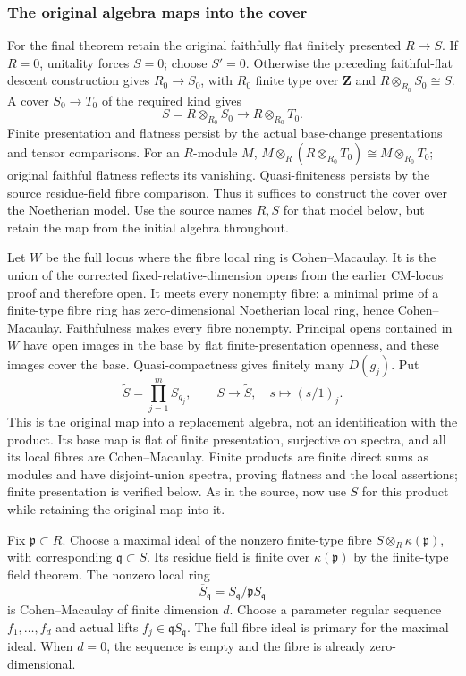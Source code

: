 \subsubsection{The original algebra maps into the cover}\label{algebra-proof-073-the-original-algebra-maps-into-the-cover}

For the final theorem retain the original faithfully flat finitely presented \(R\to S\). If \(R=0\), unitality forces \(S=0\); choose \(S'=0\). Otherwise the preceding faithful-flat descent construction gives \(R_0\to S_0\), with \(R_0\) finite type over \(\mathbf Z\) and \(R\otimes_{R_0}S_0\cong S\). A cover \(S_0\to T_0\) of the required kind gives \[
S=R\otimes_{R_0}S_0\longrightarrow R\otimes_{R_0}T_0.
\] Finite presentation and flatness persist by the actual base-change presentations and tensor comparisons. For an \(R\)-module \(M\), \(M\otimes_R(R\otimes_{R_0}T_0)\cong M\otimes_{R_0}T_0\); original faithful flatness reflects its vanishing. Quasi-finiteness persists by the source residue-field fibre comparison. Thus it suffices to construct the cover over the Noetherian model. Use the source names \(R,S\) for that model below, but retain the map from the initial algebra throughout.

Let \(W\) be the full locus where the fibre local ring is Cohen--Macaulay. It is the union of the corrected fixed-relative-dimension opens from the earlier CM-locus proof and therefore open. It meets every nonempty fibre: a minimal prime of a finite-type fibre ring has zero-dimensional Noetherian local ring, hence Cohen--Macaulay. Faithfulness makes every fibre nonempty. Principal opens contained in \(W\) have open images in the base by flat finite-presentation openness, and these images cover the base. Quasi-compactness gives finitely many \(D(g_j)\). Put \[
\widetilde S=\prod_{j=1}^m S_{g_j},\qquad
S\longrightarrow\widetilde S,\quad s\longmapsto(s/1)_j.
\] This is the original map into a replacement algebra, not an identification with the product. Its base map is flat of finite presentation, surjective on spectra, and all its local fibres are Cohen--Macaulay. Finite products are finite direct sums as modules and have disjoint-union spectra, proving flatness and the local assertions; finite presentation is verified below. As in the source, now use \(S\) for this product while retaining the original map into it.

Fix \(\mathfrak p\subset R\). Choose a maximal ideal of the nonzero finite-type fibre \(S\otimes_R\kappa(\mathfrak p)\), with corresponding \(\mathfrak q\subset S\). Its residue field is finite over \(\kappa(\mathfrak p)\) by the finite-type field theorem. The nonzero local ring \[
\overline S_{\mathfrak q}=S_{\mathfrak q}/\mathfrak pS_{\mathfrak q}
\] is Cohen--Macaulay of finite dimension \(d\). Choose a parameter regular sequence \(\overline f_1,\ldots,\overline f_d\) and actual lifts \(f_j\in\mathfrak q S_{\mathfrak q}\). The full fibre ideal is primary for the maximal ideal. When \(d=0\), the sequence is empty and the fibre is already zero-dimensional.


